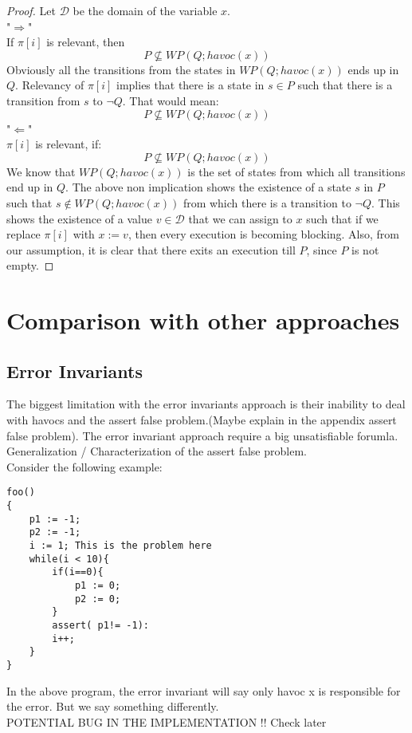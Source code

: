 \documentclass{article}
\begin{document}
\begin{proof}
Let $\mathcal{D}$ be the domain of the variable $x$. \\
"$\Rightarrow$"\\
If $\pi[i]$ is relevant, then\\
$$P \not \subseteq WP(Q;havoc(x))$$
Obviously all the transitions from the states in $WP(Q;havoc(x))$ ends up in $Q$. Relevancy of $\pi[i]$ implies that there is a state in $s \in P$ such that there is a transition from $s$ to $\neg Q$. That would mean:
$$P \not \subseteq WP(Q;havoc(x))$$
"$\Leftarrow$"\\
$\pi[i]$ is relevant, if:
$$P \not \subseteq WP(Q;havoc(x))$$
We know that $WP(Q;havoc(x))$ is the set of states from which all transitions end up in $Q$. The above non implication shows the existence of a state $s$ in $P$ such that $s \not \in WP(Q; havoc(x))$  from which there is a transition to $\neg Q$. This shows the existence of a value $v \in \mathcal{D}$ that we can assign to $x$ such that if we replace $\pi[i]$ with $x:=v$, then every execution is becoming blocking. Also, from our assumption, it is clear that there exits an execution till $P$, since $P$ is not empty.
\end{proof}
\newpage
\section{Comparison with other approaches}
\subsection{Error Invariants \cite{errorinvariants}}
The biggest limitation with the error invariants approach is their inability to deal with havocs and the assert false problem.(Maybe explain in the appendix assert false problem). The error invariant approach require a big unsatisfiable forumla.  \\
Generalization / Characterization of the assert false problem.\\
Consider the following example:

\begin{lstlisting}
foo()
{ 
	p1 := -1;
	p2 := -1;
	i := 1; This is the problem here
	while(i < 10){
		if(i==0){
			p1 := 0;
			p2 := 0;		
		}
		assert( p1!= -1):
		i++;	
	}
}
\end{lstlisting}
In the above program, the error invariant will say only havoc x is responsible for the error. But we say something differently. \\
POTENTIAL BUG IN THE IMPLEMENTATION !!
Check later
\end{document}
